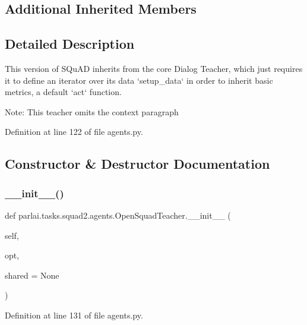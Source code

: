 \subsection*{Additional Inherited Members}


\subsection{Detailed Description}
\begin{DoxyVerb}This version of SQuAD inherits from the core Dialog Teacher, which just requires it
to define an iterator over its data `setup_data` in order to inherit basic metrics,
a default `act` function.

Note: This teacher omits the context paragraph
\end{DoxyVerb}
 

Definition at line 122 of file agents.\+py.



\subsection{Constructor \& Destructor Documentation}
\mbox{\label{classparlai_1_1tasks_1_1squad2_1_1agents_1_1OpenSquadTeacher_a97032124add4cb349ff65ac04900da82}} 
\subsubsection{\texorpdfstring{\+\_\+\+\_\+init\+\_\+\+\_\+()}{\_\_init\_\_()}}
{\footnotesize\ttfamily def parlai.\+tasks.\+squad2.\+agents.\+Open\+Squad\+Teacher.\+\_\+\+\_\+init\+\_\+\+\_\+ (\begin{DoxyParamCaption}\item[{}]{self,  }\item[{}]{opt,  }\item[{}]{shared = {\ttfamily None} }\end{DoxyParamCaption})}



Definition at line 131 of file agents.\+py.


